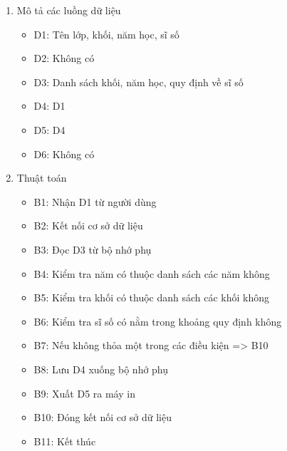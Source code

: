 \documentclass[a4paper]{article}
\begin{document}
\begin{enumerate}
\item Mô tả các luồng dữ liệu
\begin{itemize}
\item D1: Tên lớp, khối, năm học, sĩ số
\item D2: Không có
\item D3: Danh sách khối, năm học, quy định về sĩ số
\item D4: D1
\item D5: D4
\item D6: Không có
\end{itemize}
\item Thuật toán
\begin{itemize}
\item B1: Nhận D1 từ người dùng
\item B2: Kết nối cơ sở dữ liệu
\item B3: Đọc D3 từ bộ nhớ phụ
\item B4: Kiểm tra năm có thuộc danh sách các năm không
\item B5: Kiểm tra khối có thuộc danh sách các khối không
\item B6: Kiểm tra sĩ số có nằm trong khoảng quy định không
\item B7: Nếu không thỏa một trong các điều kiện => B10
\item B8: Lưu D4 xuống bộ nhớ phụ
\item B9: Xuất D5 ra máy in
\item B10: Đóng kết nối cơ sở dữ liệu
\item B11: Kết thúc
\end{itemize}
\end{enumerate}	
\end{document}
